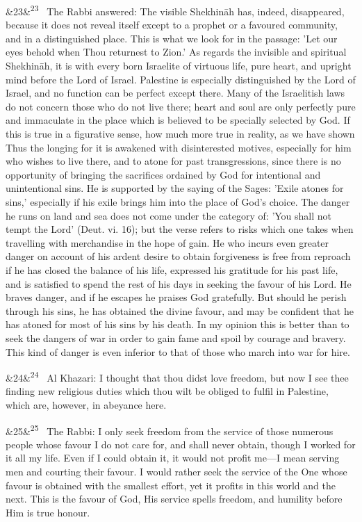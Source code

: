\documentclass[12pt]{article}
\newcommand{\para}[1][]{\par\noindent\ifx&#1&\else\textsuperscript{\footnotesize #1}~\fi}
\begin{document}
\para[23] The Rabbi answered: The visible Shekhināh has, indeed, disappeared, because it does not reveal itself except to a prophet or a favoured community, and in a distinguished place. This is what we look for in the passage: 'Let our eyes behold when Thou returnest to Zion.' As regards the invisible and spiritual Shekhināh, it is with every born Israelite of virtuous life, pure heart, and upright mind before the Lord of Israel. Palestine is especially distinguished by the Lord of Israel, and no function can be perfect except there. Many of the Israelitish laws do not concern those who do not live there; heart and soul are only perfectly pure and immaculate in the place which is believed to be specially selected by God. If this is true in a figurative sense, how much more true in reality, as we have shown Thus the longing for it is awakened with disinterested motives, especially for him who wishes to live there, and to atone for past transgressions, since there is no opportunity of bringing the sacrifices ordained by God for intentional and unintentional sins. He is supported by the saying of the Sages: 'Exile atones for sins,' especially if his exile brings him into the place of God's choice. The danger he runs on land and sea does not come under the category of: 'You shall not tempt the Lord' (Deut. vi. 16); but the verse refers to risks which one takes when travelling with merchandise in the hope of gain. He who incurs even greater danger on account of his ardent desire to obtain forgiveness is free from reproach if he has closed the balance of his life, expressed his gratitude for his past life, and is satisfied to spend the rest of his days in seeking the favour of his Lord. He braves danger, and if he escapes he praises God gratefully. But should he perish through his sins, he has obtained the divine favour, and may be confident that he has atoned for most of his sins by his death. In my opinion this is better than to seek the dangers of war in order to gain fame and spoil by courage and bravery. This kind of danger is even inferior to that of those who march into war for hire.

\para[24] Al Khazari: I thought that thou didst love freedom, but now I see thee finding new religious duties which thou wilt be obliged to fulfil in Palestine, which are, however, in abeyance here.

\para[25] The Rabbi: I only seek freedom from the service of those numerous people whose favour I do not care for, and shall never obtain, though I worked for it all my life. Even if I could obtain it, it would not profit me---I mean serving men and courting their favour. I would rather seek the service of the One whose favour is obtained with the smallest effort, yet it profits in this world and the next. This is the favour of God, His service spells freedom, and humility before Him is true honour.
\end{document}
